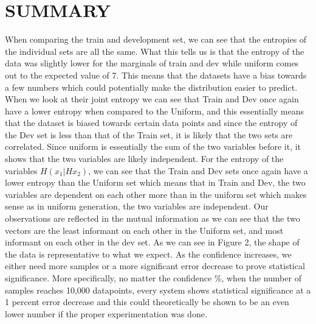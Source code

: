 \documentclass{article}
\begin{document}
\section{\MakeUppercase{Summary}}
\begin{flushleft}
  When comparing the train and development set, we can see that the entropies of the individual sets are all the same. What this tells us is that the entropy of the data was slightly lower for the marginals of train and dev while uniform comes out to the expected value of 7. This means that the datasets have a bias towards a few numbers which could potentially make the distribution easier to predict. When we look at their joint entropy we can see that Train and Dev once again have a lower entropy when compared to the Uniform, and this essentially means that the dataset is biased towards certain data points and since the entropy of the Dev set is less than that of the Train set, it is likely that the two sets are correlated. Since uniform is essentially the sum of the two variables before it, it shows that the two variables are likely independent. For the entropy of the variables $H(x_1|Hx_2)$, we can see that the Train and Dev sets once again have a lower entropy than the Uniform set which means that in Train and Dev, the two variables are dependent on each other more than in the uniform set which makes sense as in uniform generation, the two variables are independent. Our observations are reflected in the mutual information as we can see that the two vectors are the least informant on each other in the Uniform set, and most informant on each other in the dev set.\break\break
  As we can see in Figure 2, the shape of the data is representative to what we expect. As the confidence increases, we either need more samples or a more significant error decrease to prove statistical significance. More specifically, no matter the confidence \%, when the number of samples reaches 10,000 datapoints, every system shows statistical significance at a 1 percent error decrease and this could theoretically be shown to be an even lower number if the proper experimentation was done.
  \end{flushleft}
\end{document}
